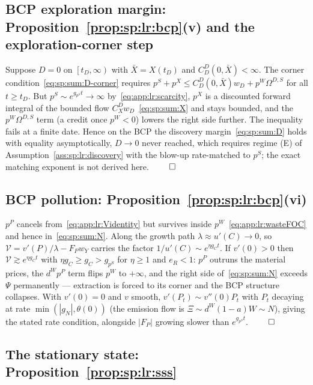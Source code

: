 \subsection{BCP exploration margin: Proposition~\ref{prop:sp:lr:bcp}(v) and the
exploration-corner step}\label{sec:app:longrun:exploration}

Suppose $D=0$ on $\left[t_D,\infty\right)$ with $\bar X=X\left(t_D\right)$ and
$C^D_D\left(0,\bar X\right)<\infty$. The corner condition~\eqref{eq:sp:sum:D-corner} requires
$p^S+p^X\le C^D_D\left(0,\bar X\right)w_D+p^W\Omega^{D,S}$ for all $t\ge t_D$. But
$p^S\sim e^{g_{p^S}t}\to\infty$ by~\eqref{eq:app:lr:scarcity}, $p^X$ is a discounted forward
integral of the bounded flow $C^D_Xw_D$~\eqref{eq:sp:sum:X} and stays bounded, and the
$p^W\Omega^{D,S}$ term (a credit once $p^W<0$) lowers the right side further. The inequality
fails at a finite date. Hence on the BCP the discovery margin~\eqref{eq:sp:sum:D} holds with
equality asymptotically, $D\to0$ never reached, which requires regime (E) of
Assumption~\ref{ass:sp:lr:discovery} with the blow-up rate-matched to $p^S$; the exact matching
exponent is not derived here. \hfill$\qed$

\subsection{BCP pollution: Proposition~\ref{prop:sp:lr:bcp}(vi)}
\label{sec:app:longrun:pollution}

$p^P$ cancels from~\eqref{eq:app:lr:Videntity} but survives inside
$p^W$~\eqref{eq:app:lr:wasteFOC} and hence in~\eqref{eq:sp:sum:N}. Along the growth path
$\lambda\approx u'(C)\to0$, so $\mathcal V=v'(P)/\lambda-F_Pw_Y$ carries the factor
$1/u'(C)\sim e^{\eta g_Ct}$. If $v'(0)>0$ then $\mathcal V\gtrsim e^{\eta g_Ct}$ with
$\eta g_C\ge g_C>g_{p^S}$ for $\eta\ge1$ and $e_R<1$: $p^P$ outruns the material prices, the
$d^Wp^P$ term flips $p^W$ to $+\infty$, and the right side of~\eqref{eq:sp:sum:N} exceeds
$\Psi$ permanently --- extraction is forced to its corner and the BCP structure collapses. With
$v'(0)=0$ and $v$ smooth, $v'\left(P_t\right)\sim v''(0)P_t$ with $P_t$ decaying at rate
$\min\left(\left|g_N\right|,\theta(0)\right)$ (the emission flow is
$\Xi\sim d^W\left(1-a\right)W\sim N$), giving the stated rate condition, alongside
$\left|F_P\right|$ growing slower than $e^{g_{p^S}t}$. \hfill$\qed$

\subsection{The stationary state: Proposition~\ref{prop:sp:lr:sss}}
\label{sec:app:longrun:sss}

